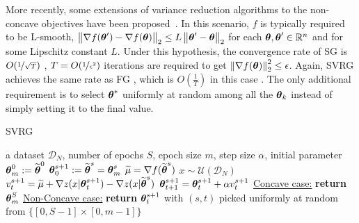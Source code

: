 More recently, some extensions of variance reduction algorithms to the non-concave objectives have been proposed~\citep[\eg][]{allen2016variance,reddi2016stochastic,reddi2016fast}. In this scenario, $f$ is typically required to be L-smooth, \ie $\norm[2]{\nabla f(\vtheta') - \nabla f(\vtheta)} \leq L\norm[2]{\vtheta'-\vtheta}$ for each $\vtheta,\vtheta'\in\realspace^n$ and for some Lipschitz constant $L$. Under this hypothesis, the convergence rate of \acs{SG} is $O(\nicefrac{1}{\sqrt{T}})$ \cite{ghadimi2013stochastic}, \ie $T=O(\nicefrac{1}{\epsilon^2})$ iterations are required to get $\norm[2]{\nabla f(\vtheta)}^2\leq\epsilon$. Again, \acs{SVRG} achieves the same rate as \acs{FG} \cite{reddi2016stochastic}, which is $O(\frac{1}{T})$ in this case \cite{nesterov2013introductory}. The only additional requirement is to select $\vtheta^*$ uniformly at random among all the $\vtheta_k$ instead of simply setting it to the final value.
\begin{algorithm}[tb]
	\caption{SVRG}
	\label{alg:svrg}
	\begin{algorithmic}
		 a dataset $\mathcal{D}_N$, number of epochs $S$, epoch size $m$, step size $\alpha$, initial parameter $\vtheta_{m}^0:=\wt{\vtheta}^0$
		\STATE $\vtheta_0^{s+1} := \wt{\vtheta}^{s} = \vtheta_{m}^s$
		\STATE $\wt{\mu} = \nabla f(\wt{\vtheta}^s)$
		\STATE $x \sim \mathcal{U}\left(\mathcal{D}_N\right)$
		\STATE $v^{s+1}_t = 
		\wt{\mu} + 
		\nabla z(x|\vtheta_t^{s+1}) -
		\nabla z(x|\wt{\vtheta}^{s})
		$
		\STATE $\vtheta_{t+1}^{s+1} = \vtheta_t^{s+1} + \alpha v^{s+1}_t$
		\ENDFOR
		\ENDFOR
		\STATE \underline{Concave case:} \textbf{return} $\vtheta_{m}^S$
		\STATE \underline{Non-Concave case:} \textbf{return} $\vtheta_t^{s+1}$ with $(s,t)$ picked uniformly at random from $\{[0,S-1]\times[0,m-1]\}$
	\end{algorithmic}
\end{algorithm}
\vspace{-0.05in}